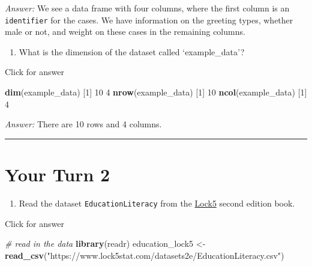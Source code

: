 \documentclass[
]{book}
\newenvironment{Shaded}{\begin{snugshade}}{\end{snugshade}}
\newcommand{\CommentTok}[1]{\textcolor[rgb]{0.56,0.35,0.01}{\textit{#1}}}
\newcommand{\DecValTok}[1]{\textcolor[rgb]{0.00,0.00,0.81}{#1}}
\newcommand{\FunctionTok}[1]{\textcolor[rgb]{0.13,0.29,0.53}{\textbf{#1}}}
\newcommand{\NormalTok}[1]{#1}
\newcommand{\OtherTok}[1]{\textcolor[rgb]{0.56,0.35,0.01}{#1}}
\newcommand{\StringTok}[1]{\textcolor[rgb]{0.31,0.60,0.02}{#1}}
\providecommand{\tightlist}{%
  \setlength{\itemsep}{0pt}\setlength{\parskip}{0pt}}
\begin{document}
\emph{Answer:} We see a data frame with four columns, where the first column is an \texttt{identifier} for the cases. We have information on the greeting types, whether male or not, and weight on these cases in the remaining columns.

\begin{enumerate}
\def\labelenumi{\alph{enumi}.}
\setcounter{enumi}{1}
\tightlist
\item
  What is the dimension of the dataset called `example\_data'?
\end{enumerate}

Click for answer

\begin{Shaded}
\begin{Highlighting}[]
\FunctionTok{dim}\NormalTok{(example\_data)}
\NormalTok{[}\DecValTok{1}\NormalTok{] }\DecValTok{10}  \DecValTok{4}
\FunctionTok{nrow}\NormalTok{(example\_data)}
\NormalTok{[}\DecValTok{1}\NormalTok{] }\DecValTok{10}
\FunctionTok{ncol}\NormalTok{(example\_data)}
\NormalTok{[}\DecValTok{1}\NormalTok{] }\DecValTok{4}
\end{Highlighting}
\end{Shaded}

\emph{Answer:} There are 10 rows and 4 columns.

\begin{center}\rule{0.5\linewidth}{0.5pt}\end{center}

\hypertarget{your-turn-2}{%
\section{Your Turn 2}\label{your-turn-2}}

\begin{enumerate}
\def\labelenumi{\alph{enumi}.}
\tightlist
\item
  Read the dataset \texttt{EducationLiteracy} from the \href{https://www.lock5stat.com/datapage2e.html}{Lock5} second edition book.
\end{enumerate}

Click for answer

\begin{Shaded}
\begin{Highlighting}[]
\CommentTok{\# read in the data}
\FunctionTok{library}\NormalTok{(readr)}
\NormalTok{education\_lock5 }\OtherTok{\textless{}{-}} \FunctionTok{read\_csv}\NormalTok{(}\StringTok{"https://www.lock5stat.com/datasets2e/EducationLiteracy.csv"}\NormalTok{)}
\end{Highlighting}
\end{Shaded}
\end{document}
